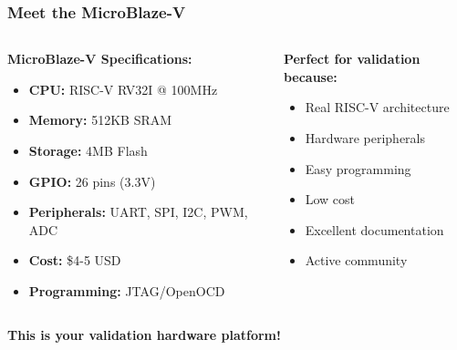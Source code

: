 \documentclass{beamer}
\begin{document}
\begin{frame}
\frametitle{Meet the MicroBlaze-V}
\begin{columns}
\begin{column}{0.6\textwidth}
\textbf{MicroBlaze-V Specifications:}
\begin{itemize}
    \item \textbf{CPU:} RISC-V RV32I @ 100MHz
    \item \textbf{Memory:} 512KB SRAM
    \item \textbf{Storage:} 4MB Flash
    \item \textbf{GPIO:} 26 pins (3.3V)
    \item \textbf{Peripherals:} UART, SPI, I2C, PWM, ADC
    \item \textbf{Cost:} \$4-5 USD
    \item \textbf{Programming:} JTAG/OpenOCD
\end{itemize}
\end{column}
\begin{column}{0.4\textwidth}
\textbf{Perfect for validation because:}
\begin{itemize}
    \item Real RISC-V architecture
    \item Hardware peripherals
    \item Easy programming
    \item Low cost
    \item Excellent documentation
    \item Active community
\end{itemize}
\end{column}
\end{columns}

\vspace{0.5cm}
\begin{center}
\textbf{This is your validation hardware platform!}
\end{center}
\end{frame}
\end{document}
